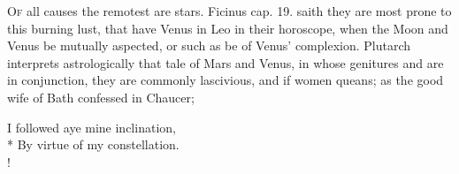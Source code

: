 \lettrine{O}{f} all causes the remotest are stars. Ficinus cap. 19. saith they
are most prone to this burning lust, that have Venus in Leo in their
horoscope, when the Moon and Venus be mutually aspected, or such as be
of Venus' complexion. Plutarch interprets astrologically that
tale of Mars and Venus, in whose genitures \Mars{} and \venus{} are in conjunction,
they are commonly lascivious, and if women queans; as the good wife of
Bath confessed in Chaucer;
%
{\gothfont%
\begin{versewithlinenos}{2}{1}{1}%
I followed aye mine inclination,\\*
By virtue of my constellation.\\!
\end{versewithlinenos}%
}%

